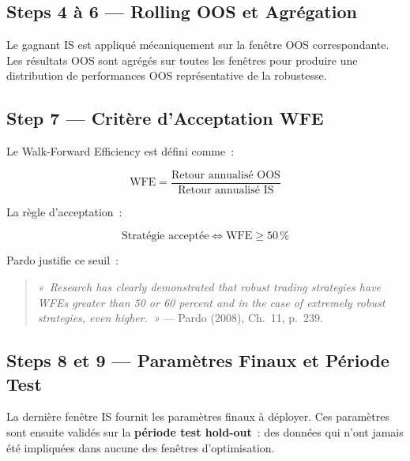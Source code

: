 \subsection{Steps 4 à 6 --- Rolling OOS et Agrégation}

Le gagnant IS est appliqué mécaniquement sur la fenêtre OOS correspondante.
Les résultats OOS sont agrégés sur toutes les fenêtres pour produire une
distribution de performances OOS représentative de la robustesse.

\subsection{Step 7 --- Critère d'Acceptation WFE}

Le Walk-Forward Efficiency est défini comme~:

\begin{equation}
\text{WFE} = \frac{\text{Retour annualisé OOS}}{\text{Retour annualisé IS}}
\label{eq:wfe}
\end{equation}

La règle d'acceptation~:

\begin{equation}
\text{Stratégie acceptée} \iff \text{WFE} \geq 50\,\%
\label{eq:wfe_critere}
\end{equation}

Pardo justifie ce seuil~:

\begin{quote}
\textit{«~Research has clearly demonstrated that robust trading strategies have WFEs
greater than 50 or 60 percent and in the case of extremely robust strategies, even
higher.~»} — Pardo (2008), Ch.~11, p.~239.
\end{quote}


\subsection{Steps 8 et 9 --- Paramètres Finaux et Période Test}

La dernière fenêtre IS fournit les paramètres finaux à déployer. Ces paramètres
sont ensuite validés sur la \textbf{période test hold-out}~: des données qui n'ont
jamais été impliquées dans aucune des fenêtres d'optimisation.


